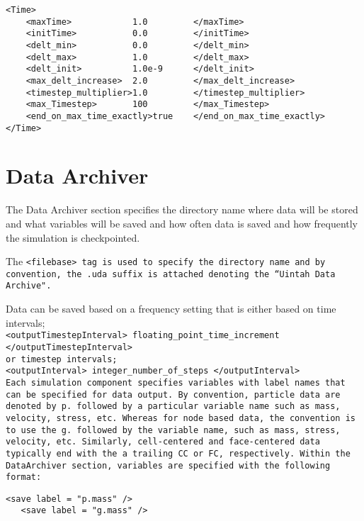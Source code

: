 \begin{Verbatim}[fontsize=\footnotesize]
<Time>
    <maxTime>            1.0         </maxTime>
    <initTime>           0.0         </initTime>
    <delt_min>           0.0         </delt_min>
    <delt_max>           1.0         </delt_max>
    <delt_init>          1.0e-9      </delt_init>
    <max_delt_increase>  2.0         </max_delt_increase>
    <timestep_multiplier>1.0         </timestep_multiplier>
    <max_Timestep>       100         </max_Timestep>
    <end_on_max_time_exactly>true    </end_on_max_time_exactly>
</Time>
\end{Verbatim}
%
\section{Data Archiver} \label{Sec:DataArchiver}

The Data Archiver section specifies the directory name where data will
be stored and what variables will be saved and how often data is saved
and how frequently the simulation is checkpointed.

The \tt <filebase> \normalfont tag is used to specify the directory
name and by convention, the \tt .uda \normalfont suffix is attached denoting the
``Uintah Data Archive".

Data can be saved based on a frequency setting that is either based on time
intervals;\\
\tt <outputTimestepInterval> floating\_point\_time\_increment </outputTimestepInterval> \normalfont\\
or timestep intervals; \\
\tt <outputInterval> integer\_number\_of\_steps </outputInterval> \normalfont\\

Each simulation component specifies variables with label names that
can be specified for data output.  By convention, particle data are
denoted by \tt p. \normalfont followed by a particular variable name
such as mass, velocity, stress, etc.  Whereas for node based data, the
convention is to use the \tt g. \normalfont followed by the variable
name, such as mass, stress, velocity, etc.  Similarly, cell-centered
and face-centered data typically end with the a trailing \tt CC \normalfont
or \tt FC, \normalfont  respectively.  Within the DataArchiver
section, variables are specified with the following format:

\begin{Verbatim}[fontsize=\footnotesize]
   <save label = "p.mass" />
   <save label = "g.mass" />
\end{Verbatim}


